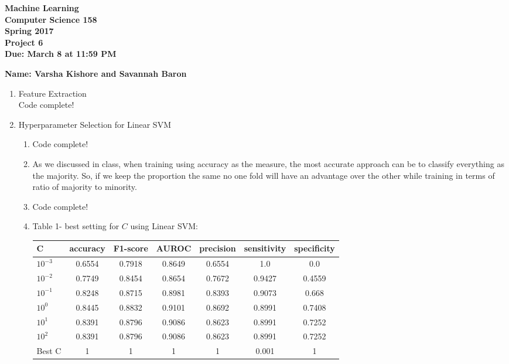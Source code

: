 \documentclass[11pt]{article}
\begin{document}
\newcommand{\Name}[1]{\noindent \textbf{Name:} #1 \\}
\newcommand{\pderiv}[2]{\frac{\partial #1}{\partial #2}}
\newcommand{\psderiv}[3]{\frac{\partial^2 #1}{\partial #2 \partial #3}}

\begin{center}
	\bf
	Machine Learning \\
	Computer Science 158 \\
	Spring 2017 \\
	\rm
	Project 6\\
	Due: March 8 at 11:59 PM \\
\end{center}
\noindent \textbf{Name: Varsha Kishore and Savannah Baron} \\
\begin{enumerate}
\item Feature Extraction \\
Code complete!
\item Hyperparameter Selection for Linear SVM
\begin{enumerate}
\item Code complete!
\item As we discussed in class, when training using accuracy as the measure, 
the most accurate approach can be to classify everything as the majority. So, if we 
keep the proportion the same no one fold will have an advantage over the other while
training in terms of ratio of majority to minority. 
\item Code complete!
\item Table 1- best setting for $C$ using Linear SVM:\\
\begin{tabular}{| l | c | c | c | c | c | c |}
  \hline		
  C & accuracy & F1-score & AUROC & precision & sensitivity & specificity \\
  \hline
  $10^{-3}$ & 0.6554 & 0.7918 & 0.8649 & 0.6554 & 1.0 & 0.0 \\
  $10^{-2}$ & 0.7749 & 0.8454 & 0.8654 & 0.7672 & 0.9427 & 0.4559  \\
  $10^{-1}$ &  0.8248 & 0.8715 & 0.8981 & 0.8393 & 0.9073 & 0.668 \\
  $10^{0}$ &  0.8445 & 0.8832 & 0.9101 & 0.8692 & 0.8991 & 0.7408 \\
  $10^{1}$ &  0.8391 & 0.8796 & 0.9086 & 0.8623 & 0.8991 & 0.7252 \\
  $10^{2}$ &  0.8391 & 0.8796 & 0.9086 & 0.8623 & 0.8991 & 0.7252 \\
  \hline
  Best C & 1 & 1 & 1 & 1 & 0.001 & 1 \\
  \hline  
\end{tabular}


\end{enumerate}
\end{enumerate}
\end{document}
